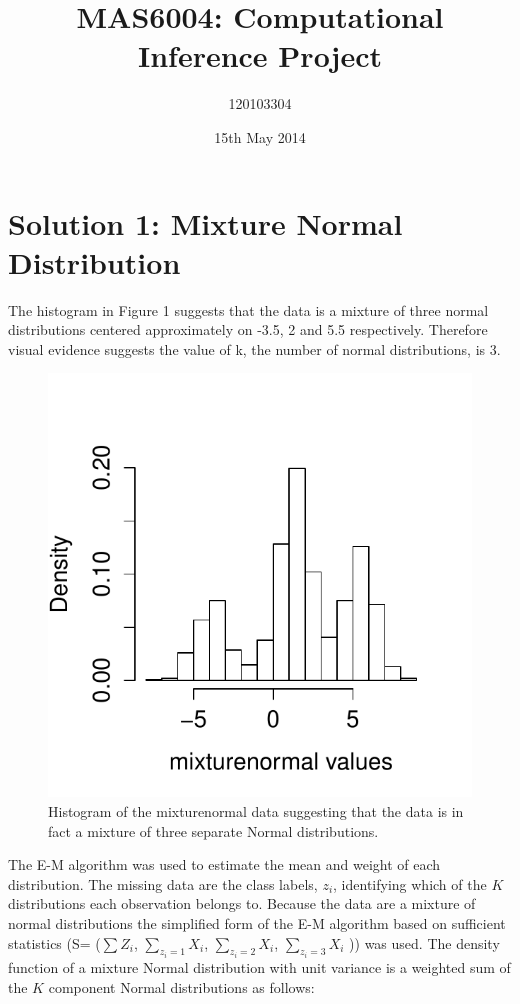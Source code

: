\documentclass[a4paper, 10pt]{article}
\title{MAS6004: Computational Inference Project}
\author{120103304}
\date{15th May 2014}
\begin{document}
\pagestyle{myheadings}

\maketitle

\section{Solution 1: Mixture Normal Distribution \label{S:S1}}
The histogram in Figure 1 suggests that the data is a mixture of three normal distributions centered approximately on -3.5, 2 and 5.5 respectively. Therefore visual evidence suggests the value of k, the number of normal distributions, is 3. 

\begin{figure}[h]
\begin{center}
\includegraphics[scale=0.75]{Histogram.pdf}
\caption{Histogram of the mixturenormal data suggesting that the data is in fact a mixture of three separate Normal distributions.}
\label{F:Box}
\end{center}
\end{figure}

The E-M algorithm was used to estimate the mean and weight of each distribution. The missing data are the class labels, $z_i$, identifying which of the $K$ distributions each observation belongs to. Because the data are a mixture of normal distributions the simplified form of the E-M algorithm based on sufficient statistics (S= ($\sum Z_i$, $\sum_{z_i=1} X_i$, $\sum_{z_i=2} X_i$, $\sum_{z_i=3} X_i$ )) was used. The density function of a mixture Normal distribution with unit variance is a weighted sum of the $K$ component Normal distributions as follows:
\end{document}
